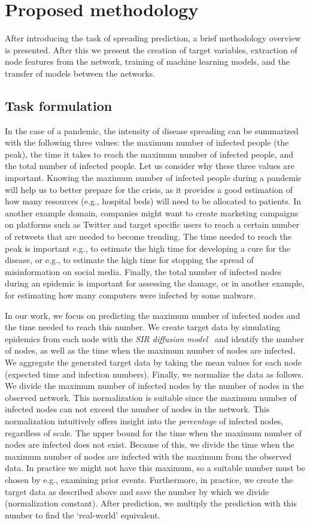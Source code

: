 \documentclass{article}
\begin{document}
\section{Proposed methodology}\label{sec:proposed-method}
After introducing the task of spreading prediction, a brief methodology overview is presented. After this we present the creation of target variables, extraction of node features from the network, training of machine learning models, and the transfer of models between the networks. 

\subsection{Task formulation}\label{sec:task-def}
In the case of a pandemic, the intensity of disease spreading can be summarized with the following three values: the maximum number of infected people (the peak), the time it takes to reach the maximum number of infected people, and the total number of infected people. Let us consider why these three values are important. Knowing the maximum number of infected people during a pandemic will help us to better prepare for the crisis, as it provides a good estimation of how many resources (e.g., hospital beds) will need to be allocated to patients. In another example domain, companies might want to create marketing campaigns on platforms such as Twitter and target specific users to reach a certain number of retweets that are needed to become trending. The time needed to reach the peak is important e.g., to estimate the high time for developing a cure for the disease, or e.g., to estimate the high time for stopping the spread of misinformation on social media. Finally, the total number of infected nodes during an epidemic is important for assessing the damage, or in another example, for estimating how many computers were infected by some malware.

In our work, we focus on predicting the maximum number of infected nodes and the time needed to reach this number. We create target data by simulating epidemics from each node with the \emph{SIR diffusion model}~\cite{ndlib} and identify the number of nodes, as well as the time when the maximum number of nodes are infected. We aggregate the generated target data by taking the mean values for each node (expected time and infection numbers). Finally, we normalize the data as follows. We divide the maximum number of infected nodes by the number of nodes in the observed network. This normalization is suitable since the maximum number of infected nodes can not exceed the number of nodes in the network. 
This normalization intuitively offers insight into the \emph{percentage} of infected nodes, regardless of scale.
The upper bound for the time when the maximum number of nodes are infected does not exist. Because of this, we divide the time when the maximum number of nodes are infected with the maximum from the observed data. In practice we might not have this maximum, so a suitable number must be chosen by e.g., examining prior events. Furthermore, in practice, we create the target data as described above and save the number by which we divide (normalization constant). After prediction, we multiply the prediction with this number to find the `real-world' equivalent. 
\end{document}
